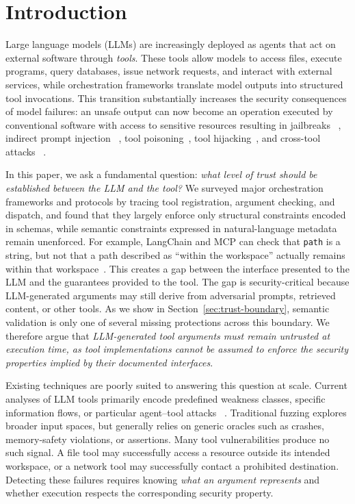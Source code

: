 \section{Introduction}
\label{sec:introduction}
Large language models (LLMs) are increasingly deployed as agents that act on
external software through \emph{tools}. These tools allow models to access
files, execute programs, query databases, issue network requests, and interact
with external services, while orchestration frameworks translate model outputs
into structured tool invocations. This transition substantially increases the
security consequences of model failures: an unsafe output can now become an
operation executed by conventional software with access to sensitive
resources resulting in jailbreaks
~\cite{zou2023universal}, indirect prompt injection
~\cite{greshake2023not}, tool poisoning~\cite{mcp-scanner}, tool
hijacking~\cite{toolhijacker}, and cross-tool attacks
~\cite{les-dissonances}. 


In this paper, we ask a fundamental question: \emph{what level of trust should be established between the LLM and the tool?} We surveyed major orchestration frameworks and protocols by tracing tool registration, argument checking, and dispatch, and found that they largely enforce only structural constraints encoded in schemas, while semantic constraints expressed in natural-language metadata remain unenforced. For example, LangChain and MCP can check that \texttt{path} is a string, but not that a path described as ``within the workspace'' actually remains within that workspace~\cite{langchain-tools,mcp-tools}. This creates a gap between the interface presented to the LLM and the guarantees provided to the tool. The gap is security-critical because LLM-generated arguments may still derive from adversarial prompts, retrieved content, or other tools. As we show in Section~\ref{sec:trust-boundary}, semantic validation is only one of several missing protections across this boundary. We therefore argue that \emph{LLM-generated tool arguments must remain untrusted at execution time, as tool implementations cannot be assumed to enforce the security properties implied by their documented interfaces}.

Existing techniques are poorly suited to answering this question at scale.
Current analyses of LLM tools primarily encode predefined weakness classes,
specific information flows, or particular agent--tool attacks
~\cite{mcp-first-glance,mcp-seclint,mcp-scanner,les-dissonances}. Traditional
fuzzing explores broader input spaces, but generally relies on generic oracles
such as crashes, memory-safety violations, or assertions. Many tool
vulnerabilities produce no such signal. A file tool may successfully access a
resource outside its intended workspace, or a network tool may successfully
contact a prohibited destination. Detecting these failures requires knowing
\emph{what an argument represents} and whether execution respects the
corresponding security property.

